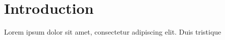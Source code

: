 \label{chp:research_1}
%
\section{Introduction}
Lorem ipsum dolor sit amet, consectetur adipiscing elit. Duis tristique
